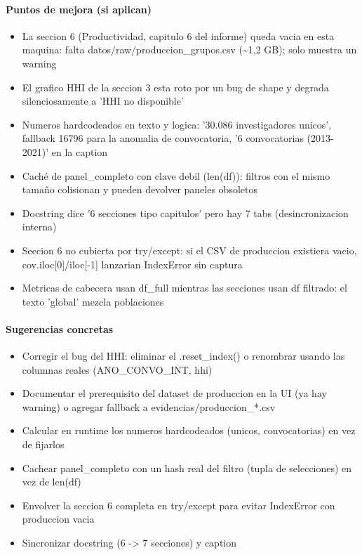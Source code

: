 \paragraph{Puntos de mejora (si aplican)}
\begin{itemize}
  \item La seccion 6 (Productividad, capitulo 6 del informe) queda vacia en esta maquina: falta datos/raw/produccion\_grupos.csv (\textasciitilde{}1,2 GB); solo muestra un warning
  \item El grafico HHI de la seccion 3 esta roto por un bug de shape y degrada silenciosamente a 'HHI no disponible'
  \item Numeros hardcodeados en texto y logica: '30.086 investigadores unicos', fallback 16796 para la anomalia de convocatoria, '6 convocatorias (2013-2021)' en la caption
  \item Caché de panel\_completo con clave debil (len(df)): filtros con el mismo tamaño colisionan y pueden devolver paneles obsoletos
  \item Docstring dice '6 secciones tipo capitulos' pero hay 7 tabs (desincronizacion interna)
  \item Seccion 6 no cubierta por try/except: si el CSV de produccion existiera vacio, cov.iloc[0]/iloc[-1] lanzarian IndexError sin captura
  \item Metricas de cabecera usan df\_full mientras las secciones usan df filtrado: el texto 'global' mezcla poblaciones
\end{itemize}

\paragraph{Sugerencias concretas}
\begin{itemize}
  \item Corregir el bug del HHI: eliminar el .reset\_index() o renombrar usando las columnas reales (ANO\_CONVO\_INT, hhi)
  \item Documentar el prerequisito del dataset de produccion en la UI (ya hay warning) o agregar fallback a evidencias/produccion\_*.csv
  \item Calcular en runtime los numeros hardcodeados (unicos, convocatorias) en vez de fijarlos
  \item Cachear panel\_completo con un hash real del filtro (tupla de selecciones) en vez de len(df)
  \item Envolver la seccion 6 completa en try/except para evitar IndexError con produccion vacia
  \item Sincronizar docstring (6 -> 7 secciones) y caption
\end{itemize}

